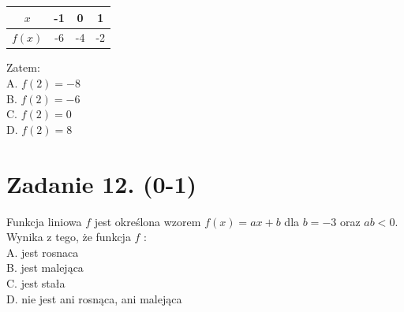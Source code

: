 \documentclass[10pt]{article}
\begin{document}
\begin{center}
\begin{tabular}{|c|c|c|c|}
\hline
\(x\) & -1 & 0 & 1 \\
\hline
\(f(x)\) & -6 & -4 & -2 \\
\hline
\end{tabular}
\end{center}

Zatem:\\
A. \(f(2)=-8\)\\
B. \(f(2)=-6\)\\
C. \(f(2)=0\)\\
D. \(f(2)=8\)

\section*{Zadanie 12. (0-1)}
Funkcja liniowa \(f\) jest określona wzorem \(f(x)=a x+b\) dla \(b=-3\) oraz \(a b<0\). Wynika z tego, że funkcja \(f\) :\\
A. jest rosnaca\\
B. jest malejąca\\
C. jest stała\\
D. nie jest ani rosnąca, ani malejąca
\end{document}
